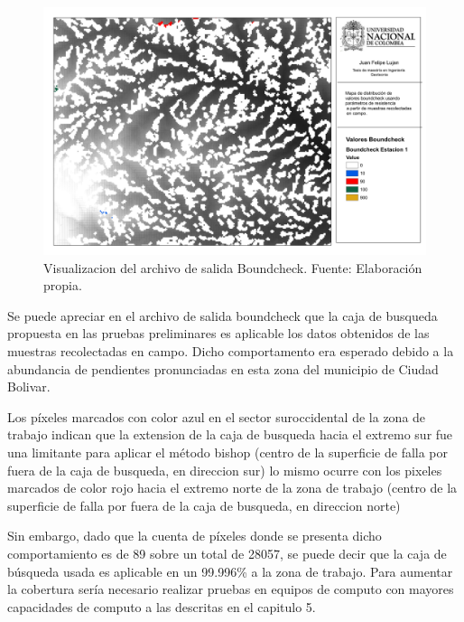 \begin{figure}[H]
\centering
\includegraphics[scale=0.3]{img/boundcheckCampo.pdf}
\caption{Visualizacion del archivo de salida Boundcheck. Fuente: Elaboración propia.}
\label{fig:dem usado}
\end{figure}

Se puede apreciar en el archivo de salida \textsf{boundcheck} que la caja de busqueda propuesta en las pruebas preliminares es aplicable los datos obtenidos de las muestras recolectadas en campo. Dicho comportamento era esperado debido a la abundancia de pendientes pronunciadas en esta zona del municipio de Ciudad Bolivar. 

Los píxeles marcados con color azul en el sector suroccidental de la zona de trabajo indican que la extension de la caja de busqueda hacia el extremo sur fue una limitante para aplicar el método bishop (centro de la superficie de falla por fuera de la caja de busqueda, en direccion sur) lo mismo ocurre con los pixeles marcados de color rojo hacia el extremo norte de la zona de trabajo (centro de la superficie de falla por fuera de la caja de busqueda, en direccion norte)

Sin embargo, dado que la cuenta de píxeles donde se presenta dicho comportamiento es de 89 sobre un total de 28057, se puede decir que la caja de b\'usqueda usada es aplicable en un 99.996\% a la zona de trabajo.
Para aumentar la cobertura ser\'ia necesario realizar pruebas en equipos de computo con mayores capacidades de computo a las descritas en el capitulo 5.



